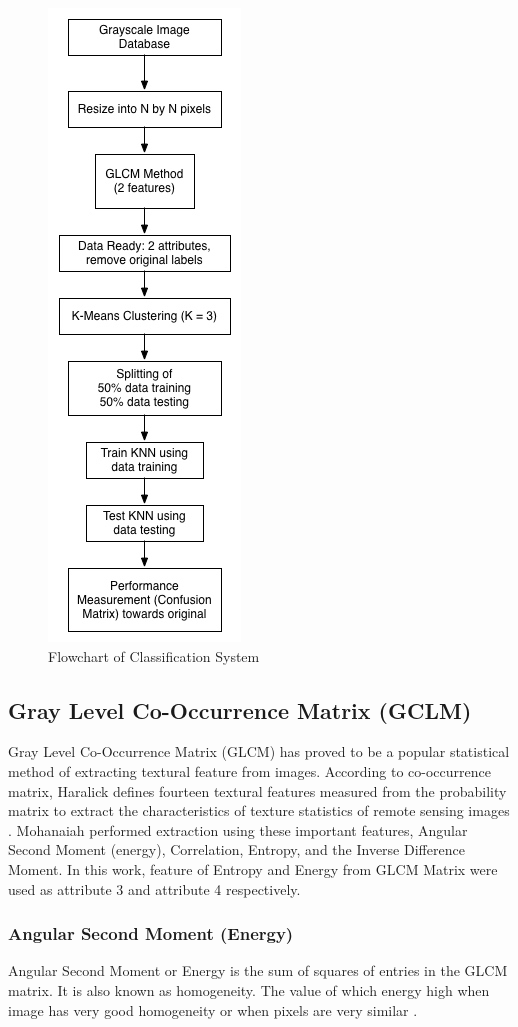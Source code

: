 \documentclass[conference]{IEEEtran}
\begin{document}
\begin{figure}[!t]
\centering
\includegraphics[width=1.3 in]{flowchart-tugas.jpg}
\caption{Flowchart of Classification System}
\label{fig:flowchart}
\end{figure}

\subsection{Gray Level Co-Occurrence Matrix (GCLM)}

Gray Level Co-Occurrence Matrix (GLCM) has proved to be a popular statistical method of extracting textural feature from images. According to co-occurrence matrix, Haralick defines fourteen textural features measured from the probability matrix to extract the characteristics of texture statistics of remote sensing images \cite{Costianes}. Mohanaiah \cite{Mohanaiah2013} performed extraction using these important features, Angular Second Moment (energy), Correlation, Entropy, and the Inverse Difference Moment. In this work, feature of Entropy and Energy from GLCM Matrix were used as attribute 3 and attribute 4 respectively. 

\subsubsection{Angular Second Moment (Energy)}
Angular Second Moment or Energy is the sum of squares of entries in the GLCM matrix. It is also known as homogeneity. The value of which energy high when image has very good homogeneity or when pixels are very similar \cite{Mohanaiah2013}. 
\end{document}

